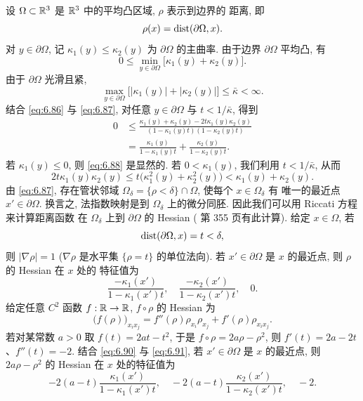 设 $\Omega\subset\mathbb{R}^3$ 是 $\mathbb{R}^3$ 中的平均凸区域, $\rho$ 表示到边界的
距离, 即
\begin{equation}
\rho(x)=\operatorname{dist}(\partial\Omega,x).
\label{eq:6.85}
\end{equation}
对 $y\in\partial\Omega$, 记 $\kappa_1(y)\leq\kappa_2(y)$ 为
$\partial\Omega$ 的主曲率. 由于边界 $\partial\Omega$ 平均凸, 有
\begin{equation}
0\leq\min_{y\in\partial\Omega}\bigl[\kappa_1(y)+\kappa_2(y)\bigr].
\label{eq:6.86}
\end{equation}
由于 $\partial\Omega$ 光滑且紧,
\begin{equation}
\max_{y\in\partial\Omega}\bigl[|\kappa_1(y)|+|\kappa_2(y)|\bigr]
\leq\bar{\kappa}<\infty.
\label{eq:6.87}
\end{equation}
结合 \eqref{eq:6.86} 与 \eqref{eq:6.87}, 对任意 $y\in\partial\Omega$ 与
$t<1/\bar{\kappa}$, 得到
\begin{equation}
\begin{aligned}
0&\leq\frac{\kappa_1(y)+\kappa_2(y)-2t\kappa_1(y)\kappa_2(y)}
{(1-\kappa_1(y)t)(1-\kappa_2(y)t)}\\
&=\frac{\kappa_1(y)}{1-\kappa_1(y)t}+\frac{\kappa_2(y)}{1-\kappa_2(y)t}.
\end{aligned}
\label{eq:6.88}
\end{equation}
若 $\kappa_1(y)\leq0$, 则 \eqref{eq:6.88} 是显然的. 若
$0<\kappa_1(y)$, 我们利用 $t<1/\bar{\kappa}$, 从而
\begin{equation}
2t\kappa_1(y)\kappa_2(y)\leq t\bigl(\kappa_1^2(y)+\kappa_2^2(y)\bigr)
<\kappa_1(y)+\kappa_2(y).
\label{eq:6.89}
\end{equation}
由 \eqref{eq:6.87}, 存在管状邻域
$\Omega_\delta=\{\rho<\delta\}\cap\Omega$, 使每个 $x\in\Omega_\delta$ 有
唯一的最近点 $x'\in\partial\Omega$. 换言之, 法指数映射是到
$\Omega_\delta$ 上的微分同胚. 因此我们可以用 Riccati 方程来计算距离函数
在 $\Omega_\delta$ 上到 $\partial\Omega$ 的 Hessian (\cite{GiTr} 第 355
页有此计算). 给定 $x\in\Omega$, 若
\begin{equation*}
\operatorname{dist}(\partial\Omega,x)=t<\delta,
\end{equation*}
则 $|\nabla\rho|=1$ ($\nabla\rho$ 是水平集 $\{\rho=t\}$ 的单位法向). 若
$x'\in\partial\Omega$ 是 $x$ 的最近点, 则 $\rho$ 的 Hessian 在 $x$ 处的
特征值为
\begin{equation}
\frac{-\kappa_1(x')}{1-\kappa_1(x')t},\quad
\frac{-\kappa_2(x')}{1-\kappa_2(x')t},\quad 0.
\label{eq:6.90}
\end{equation}
给定任意 $C^2$ 函数 $f:\mathbb{R}\to\mathbb{R}$, $f\circ\rho$ 的 Hessian 为
\begin{equation}
\bigl(f(\rho)\bigr)_{x_ix_j}
=f''(\rho)\rho_{x_i}\rho_{x_j}+f'(\rho)\rho_{x_ix_j}.
\label{eq:6.91}
\end{equation}
若对某常数 $a>0$ 取 $f(t)=2at-t^2$, 于是 $f\circ\rho=2a\rho-\rho^2$, 则
$f'(t)=2a-2t$、$f''(t)=-2$. 结合 \eqref{eq:6.90} 与 \eqref{eq:6.91}, 若
$x'\in\partial\Omega$ 是 $x$ 的最近点, 则 $2a\rho-\rho^2$ 的 Hessian 在
$x$ 处的特征值为
\begin{equation}
-2(a-t)\frac{\kappa_1(x')}{1-\kappa_1(x')t},\quad
-2(a-t)\frac{\kappa_2(x')}{1-\kappa_2(x')t},\quad -2.
\label{eq:6.92}
\end{equation}

